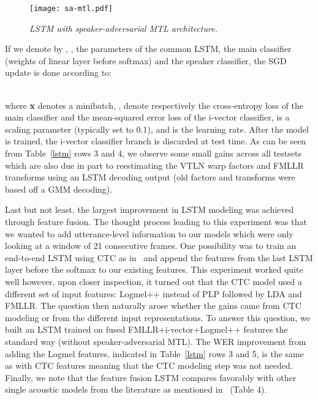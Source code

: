 \documentclass[a4paper]{article}
\begin{document}
\begin{figure}[htpb]
 \begin{center}
   \texttt{[image: sa-mtl.pdf]}
       \caption{{\it LSTM with speaker-adversarial MTL architecture.}}
       \label{sa-mtl}
  \end{center}
\end{figure}

If we denote by , ,  the parameters of the common LSTM, the main classifier (weights of linear layer before softmax) and the speaker classifier, the SGD update is done according to:


~~\\
where {\bf x} denotes a minibatch, ,  denote respectively the
cross-entropy loss of the main classifier and the mean-squared error
loss of the i-vector classifier,  is a scaling parameter
(typically set to 0.1), and  is the learning rate. After the
model is trained, the i-vector classifier branch is discarded at test
time. As can be seen from Table~\ref{lstm} rows 3 and 4, we observe
some small gains across all testsets which are also due in part to
reestimating the VTLN warp factors and FMLLR transforms using an LSTM
decoding output (old factors and transforms were based off a GMM
decoding).

Last but not least, the largest improvement in LSTM modeling was
achieved through feature fusion. The thought process leading to this
experiment was that we wanted to add utterance-level information to
our models which were only looking at a window of 21 consecutive
frames. One possibility was to train an end-to-end LSTM using CTC as
in~\cite{miao15,sak15,soltau16,liu17} and append the features from the
last LSTM layer before the softmax to our existing features. This
experiment worked quite well however, upon closer inspection, it
turned out that the CTC model used a different set of input features:
Logmel++ instead of PLP followed by LDA and
FMLLR. The question then naturally arose whether the gains came from
CTC modeling or from the different input representations. To answer
this question, we built an LSTM trained on fused
FMLLR+i-vector+Logmel++ features the standard
way (without speaker-adversarial MTL). The WER improvement from adding the
Logmel features, indicated in Table~\ref{lstm} rows 3 and 5, is the
same as with CTC features meaning that the CTC modeling step was not
needed. Finally, we note that the feature fusion LSTM compares
favorably with other single acoustic models from the literature as
mentioned in~\cite{liu17} (Table 4).
\end{document}

